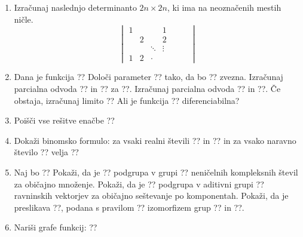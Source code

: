 \documentclass[a4paper,12pt]{article}
\begin{document}
\begin{enumerate}
\item Izračunaj naslednjo determinanto $2n\times 2n$, ki ima na neoznačenih mestih ničle.
%
\[
\begin{vmatrix}
    1 & & & 1 & & & \\
    & 2 & & 2 & & & \\
    & & \ddots & \vdots & & & \\
    1 & 2 & \cdot
\end{vmatrix}   
\]
%
\item Dana je funkcija
??
Določi parameter ?? tako, da bo ?? zvezna.
Izračunaj parcialna odvoda ?? in ?? za ??.
Izračunaj parcialna odvoda ?? in ??.
Če obstaja, izračunaj limito
??
Ali je funkcija ?? diferenciabilna?

\item Poišči vse rešitve enačbe
??

\item Dokaži binomsko formulo: za vsaki realni števili ?? in ?? in za vsako naravno število ?? velja
??

\item Naj bo
??
Pokaži, da je ?? podgrupa v grupi ??
neničelnih kompleksnih števil za običajno množenje.
Pokaži, da je ?? podgrupa v aditivni grupi ??
ravninskih vektorjev za običajno seštevanje po komponentah.
Pokaži, da je preslikava ??, podana s pravilom
??
izomorfizem grup ?? in ??.

\item Nariši grafe funkcij:
??

\end{enumerate}
\end{document}
